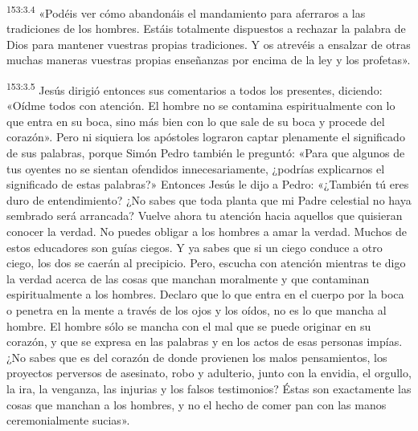 \par 
\textsuperscript{153:3.4} «Podéis ver cómo abandonáis el mandamiento para aferraros a las tradiciones de los hombres. Estáis totalmente dispuestos a rechazar la palabra de Dios para mantener vuestras propias tradiciones. Y os atrevéis a ensalzar de otras muchas maneras vuestras propias enseñanzas por encima de la ley y los profetas».

\par 
\textsuperscript{153:3.5} Jesús dirigió entonces sus comentarios a todos los presentes, diciendo: «Oídme todos con atención. El hombre no se contamina espiritualmente con lo que entra en su boca, sino más bien con lo que sale de su boca y procede del corazón». Pero ni siquiera los apóstoles lograron captar plenamente el significado de sus palabras, porque Simón Pedro también le preguntó: «Para que algunos de tus oyentes no se sientan ofendidos innecesariamente, ¿podrías explicarnos el significado de estas palabras?» Entonces Jesús le dijo a Pedro: «¿También tú eres duro de entendimiento? ¿No sabes que toda planta que mi Padre celestial no haya sembrado será arrancada? Vuelve ahora tu atención hacia aquellos que quisieran conocer la verdad. No puedes obligar a los hombres a amar la verdad. Muchos de estos educadores son guías ciegos. Y ya sabes que si un ciego conduce a otro ciego, los dos se caerán al precipicio. Pero, escucha con atención mientras te digo la verdad acerca de las cosas que manchan moralmente y que contaminan espiritualmente a los hombres. Declaro que lo que entra en el cuerpo por la boca o penetra en la mente a través de los ojos y los oídos, no es lo que mancha al hombre. El hombre sólo se mancha con el mal que se puede originar en su corazón, y que se expresa en las palabras y en los actos de esas personas impías. ¿No sabes que es del corazón de donde provienen los malos pensamientos, los proyectos perversos de asesinato, robo y adulterio, junto con la envidia, el orgullo, la ira, la venganza, las injurias y los falsos testimonios? Éstas son exactamente las cosas que manchan a los hombres, y no el hecho de comer pan con las manos ceremonialmente sucias».

